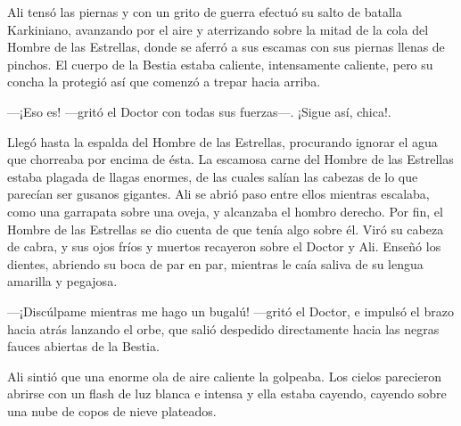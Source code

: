 Ali tensó las piernas y con un grito de guerra efectuó su salto de
batalla Karkiniano, avanzando por el aire y aterrizando sobre la mitad
de la cola del Hombre de las Estrellas, donde se aferró a sus escamas
con sus piernas llenas de pinchos. El cuerpo de la Bestia estaba
caliente, intensamente caliente, pero su concha la protegió así que
comenzó a trepar hacia arriba.

---¡Eso es! ---gritó el Doctor con todas sus fuerzas---. ¡Sigue así,
chica!.

Llegó hasta la espalda del Hombre de las Estrellas, procurando ignorar
el agua que chorreaba por encima de ésta. La escamosa carne del Hombre
de las Estrellas estaba plagada de llagas enormes, de las cuales salían
las cabezas de lo que parecían ser gusanos gigantes. Ali se abrió paso
entre ellos mientras escalaba, como una garrapata sobre una oveja, y
alcanzaba el hombro derecho. Por fin, el Hombre de las Estrellas se dio
cuenta de que tenía algo sobre él. Viró su cabeza de cabra, y sus ojos
fríos y muertos recayeron sobre el Doctor y Ali. Enseñó los dientes,
abriendo su boca de par en par, mientras le caía saliva de su lengua
amarilla y pegajosa.

---¡Discúlpame mientras me hago un bugalú! ---gritó el Doctor, e impulsó
el brazo hacia atrás lanzando el orbe, que salió despedido directamente
hacia las negras fauces abiertas de la Bestia.

Ali sintió que una enorme ola de aire caliente la golpeaba. Los cielos
parecieron abrirse con un flash de luz blanca e intensa y ella estaba
cayendo, cayendo sobre una nube de copos de nieve plateados.